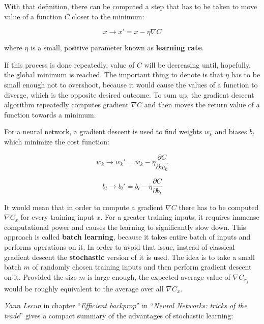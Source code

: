 With that definition, there can be computed a step that has to be taken to move value of a function $C$ closer to the minimum:

\begin{equation}
x \longrightarrow x' = x - \eta \nabla C
\end{equation}

where $\eta$ is a small, positive parameter known as \textbf{learning rate}.

If this process is done repeatedly, value of $C$ will be decreasing until, hopefully, the global minimum is reached. The important thing to denote is that $\eta$ has to be small enough not to overshoot, because it would cause the values of a function to diverge, which is the opposite desired outcome. To sum up, the gradient descent algorithm repeatedly computes gradient $\nabla C$ and then moves the return value of a function towards a minimum.

For a neural network, a gradient descent is used to find weights $w_k$ and biases $b_l$ which minimize the cost function:

\begin{equation}
    w_k \longrightarrow w_k' = w_k - \eta \frac{\partial C}{\partial w_k}
\end{equation}

\begin{equation}
    b_l \longrightarrow b_l' = b_l - \eta \frac{\partial C}{\partial b_l}
\end{equation}

It would mean that in order to compute a gradient $\nabla C$ there has to be computed $\nabla C_x$ for every training input $x$. For a greater training inputs, it requires immense computational power and causes the learning to significantly slow down. This approach is called \textbf{batch learning}, because it takes entire batch of inputs and performs operations on it. In order to avoid that issue, instead of classical gradient descent the \textbf{stochastic} version of it is used. The idea is to take a small batch $m$ of randomly chosen training inputs and then perform gradient descent on it. Provided the size $m$ is large enough, the expected average value of $\nabla C_{x_j}$ would be roughly equivalent to the average over all $\nabla C_x$.

\emph{Yann Lecun} in chapter ``\emph{Efficient backprop}'' in ``\emph{Neural Networks: tricks of the trade}'' \cite{EfficientBackProp} gives a compact summary of the advantages of stochastic learning:

